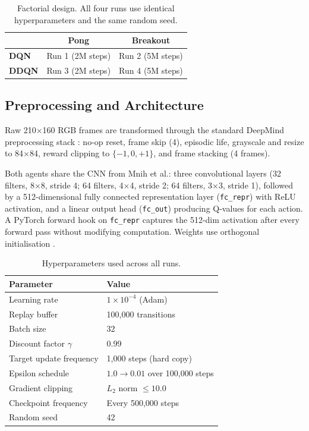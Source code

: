 \documentclass[a4paper]{article}
\begin{document}
\begin{table}[H]
\centering
\caption{Factorial design. All four runs use identical hyperparameters and the same random seed.}
\label{tab:factorial}
\begin{tabular}{lcc}
\toprule
 & \textbf{Pong} & \textbf{Breakout} \\
\midrule
\textbf{DQN}  & Run 1 (2M steps) & Run 2 (5M steps) \\
\textbf{DDQN} & Run 3 (2M steps) & Run 4 (5M steps) \\
\bottomrule
\end{tabular}
\end{table}

\subsection{Preprocessing and Architecture}

Raw 210$\times$160 RGB frames are transformed through the standard DeepMind preprocessing stack \cite{mnih2015human}: no-op reset, frame skip (4), episodic life, grayscale and resize to 84$\times$84, reward clipping to $\{-1, 0, +1\}$, and frame stacking (4 frames).

Both agents share the CNN from Mnih et al.: three convolutional layers (32 filters, 8$\times$8, stride 4; 64 filters, 4$\times$4, stride 2; 64 filters, 3$\times$3, stride 1), followed by a 512-dimensional fully connected representation layer (\texttt{fc\_repr}) with ReLU activation, and a linear output head (\texttt{fc\_out}) producing Q-values for each action. A PyTorch forward hook on \texttt{fc\_repr} captures the 512-dim activation after every forward pass without modifying computation. Weights use orthogonal initialisation \cite{saxe2013exact}.

\begin{table}[H]
\centering
\caption{Hyperparameters used across all runs.}
\label{tab:hyperparams}
\begin{tabularx}{\linewidth}{lX}
\toprule
\textbf{Parameter} & \textbf{Value} \\
\midrule
Learning rate            & $1 \times 10^{-4}$ (Adam) \\
Replay buffer            & 100,000 transitions \\
Batch size               & 32 \\
Discount factor $\gamma$ & 0.99 \\
Target update frequency  & 1,000 steps (hard copy) \\
Epsilon schedule         & $1.0 \to 0.01$ over 100,000 steps \\
Gradient clipping        & $L_2$ norm $\leq 10.0$ \\
Checkpoint frequency     & Every 500,000 steps \\
Random seed              & 42 \\
\bottomrule
\end{tabularx}
\end{table}
\end{document}
